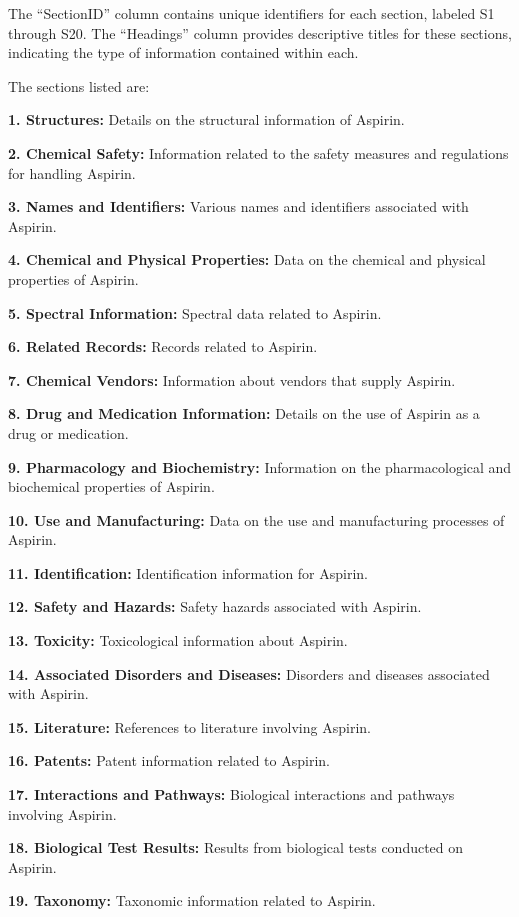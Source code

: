 The ``SectionID'' column contains unique identifiers for each section, labeled S1 through S20. The ``Headings'' column provides descriptive titles for these sections, indicating the type of information contained within each.

The sections listed are:

\textbf{1. Structures:} Details on the structural information of Aspirin.

\textbf{2. Chemical Safety:} Information related to the safety measures and regulations for handling Aspirin.

\textbf{3. Names and Identifiers:} Various names and identifiers associated with Aspirin.

\textbf{4. Chemical and Physical Properties:} Data on the chemical and physical properties of Aspirin.

\textbf{5. Spectral Information:} Spectral data related to Aspirin.

\textbf{6. Related Records:} Records related to Aspirin.

\textbf{7. Chemical Vendors:} Information about vendors that supply Aspirin.

\textbf{8. Drug and Medication Information:} Details on the use of Aspirin as a drug or medication.

\textbf{9. Pharmacology and Biochemistry:} Information on the pharmacological and biochemical properties of Aspirin.

\textbf{10. Use and Manufacturing:} Data on the use and manufacturing processes of Aspirin.

\textbf{11. Identification:} Identification information for Aspirin.

\textbf{12. Safety and Hazards:} Safety hazards associated with Aspirin.

\textbf{13. Toxicity:} Toxicological information about Aspirin.

\textbf{14. Associated Disorders and Diseases:} Disorders and diseases associated with Aspirin.

\textbf{15. Literature:} References to literature involving Aspirin.

\textbf{16. Patents:} Patent information related to Aspirin.

\textbf{17. Interactions and Pathways:} Biological interactions and pathways involving Aspirin.

\textbf{18. Biological Test Results:} Results from biological tests conducted on Aspirin.

\textbf{19. Taxonomy:} Taxonomic information related to Aspirin.


